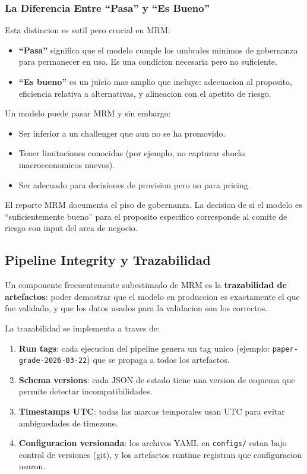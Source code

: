 \documentclass[
  spanish,
  11pt,
  letterpaper,
]{scrbook}
\providecommand{\tightlist}{%
  \setlength{\itemsep}{0pt}\setlength{\parskip}{0pt}}
\theoremstyle{plain}
\theoremstyle{remark}
\begin{document}
\subsubsection{La Diferencia Entre ``Pasa'' y ``Es
Bueno''}\label{la-diferencia-entre-pasa-y-es-bueno}

Esta distincion es sutil pero crucial en MRM:

\begin{itemize}
\tightlist
\item
  \textbf{``Pasa''} significa que el modelo cumple los umbrales minimos
  de gobernanza para permanecer en uso. Es una condicion necesaria pero
  no suficiente.
\item
  \textbf{``Es bueno''} es un juicio mas amplio que incluye: adecuacion
  al proposito, eficiencia relativa a alternativas, y alineacion con el
  apetito de riesgo.
\end{itemize}

Un modelo puede pasar MRM y sin embargo:

\begin{itemize}
\tightlist
\item
  Ser inferior a un challenger que aun no se ha promovido.
\item
  Tener limitaciones conocidas (por ejemplo, no capturar shocks
  macroeconomicos nuevos).
\item
  Ser adecuado para decisiones de provision pero no para pricing.
\end{itemize}

El reporte MRM documenta el piso de gobernanza. La decision de si el
modelo es ``suficientemente bueno'' para el proposito especifico
corresponde al comite de riesgo con input del area de negocio.

\subsection{Pipeline Integrity y
Trazabilidad}\label{sec-mrm-pipeline-integrity}

Un componente frecuentemente subestimado de MRM es la
\textbf{trazabilidad de artefactos}: poder demostrar que el modelo en
produccion es exactamente el que fue validado, y que los datos usados
para la validacion son los correctos.

La trazabilidad se implementa a traves de:

\begin{enumerate}
\def\labelenumi{\arabic{enumi}.}
\tightlist
\item
  \textbf{Run tags}: cada ejecucion del pipeline genera un tag unico
  (ejemplo: \texttt{paper-grade-2026-03-22}) que se propaga a todos los
  artefactos.
\item
  \textbf{Schema versions}: cada JSON de estado tiene una version de
  esquema que permite detectar incompatibilidades.
\item
  \textbf{Timestamps UTC}: todas las marcas temporales usan UTC para
  evitar ambiguedades de timezone.
\item
  \textbf{Configuracion versionada}: los archivos YAML en
  \texttt{configs/} estan bajo control de versiones (git), y los
  artefactos runtime registran que configuracion usaron.
\end{enumerate}
\end{document}
